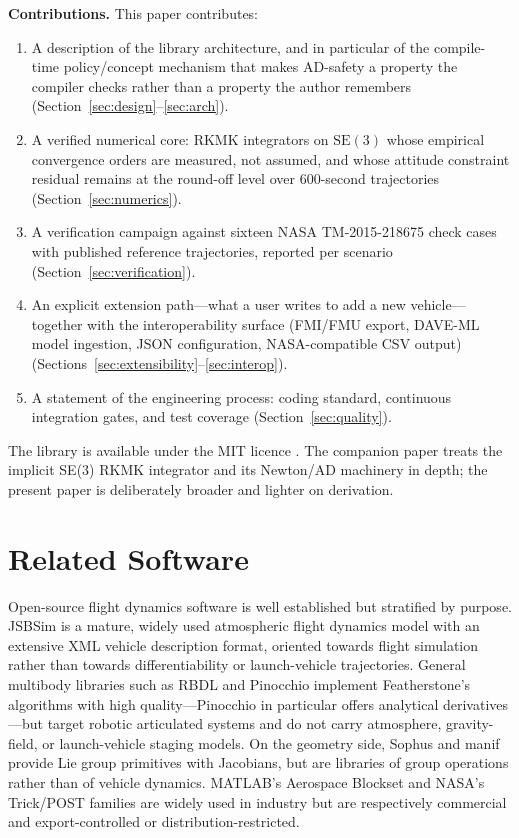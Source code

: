 \documentclass[a4paper,10pt]{article}
\newcommand{\SE}{\mathrm{SE}(3)}
\theoremstyle{definition}
\begin{document}
\textbf{Contributions.}  This paper contributes:

\begin{enumerate}[leftmargin=*, label=(\arabic*)]
  \item A description of the library architecture, and in particular of the
    compile-time policy/concept mechanism that makes AD-safety a property the
    compiler checks rather than a property the author remembers
    (Section~\ref{sec:design}--\ref{sec:arch}).
  \item A verified numerical core: RKMK integrators on $\SE$ whose empirical
    convergence orders are measured, not assumed, and whose attitude constraint
    residual remains at the round-off level over 600-second trajectories
    (Section~\ref{sec:numerics}).
  \item A verification campaign against sixteen NASA TM-2015-218675 check
    cases with published reference trajectories, reported per scenario
    (Section~\ref{sec:verification}).
  \item An explicit extension path---what a user writes to add a new
    vehicle---together with the interoperability surface (FMI/FMU export,
    DAVE-ML model ingestion, JSON configuration, NASA-compatible CSV output)
    (Sections~\ref{sec:extensibility}--\ref{sec:interop}).
  \item A statement of the engineering process: coding standard, continuous
    integration gates, and test coverage (Section~\ref{sec:quality}).
\end{enumerate}

The library is available under the MIT licence \citep{aetherion_2025}.  The
companion paper \citep{tuncer2027rkmk} treats the implicit SE(3) RKMK
integrator and its Newton/AD machinery in depth; the present paper is
deliberately broader and lighter on derivation.

\section{Related Software}
\label{sec:related}

Open-source flight dynamics software is well established but stratified by
purpose.  JSBSim \citep{berndt2004jsbsim} is a mature, widely used
atmospheric flight dynamics model with an extensive XML vehicle description
format, oriented towards flight simulation rather than towards
differentiability or launch-vehicle trajectories.  General multibody
libraries such as RBDL \citep{felis2017rbdl} and Pinocchio
\citep{carpentier2019pinocchio} implement Featherstone's algorithms with high
quality---Pinocchio in particular offers analytical derivatives---but target
robotic articulated systems and do not carry atmosphere, gravity-field, or
launch-vehicle staging models.  On the geometry side, Sophus and manif
\citep{deray2020manif} provide Lie group primitives with Jacobians, but are
libraries of group operations rather than of vehicle dynamics.  MATLAB's
Aerospace Blockset and NASA's Trick/POST families are widely used in
industry but are respectively commercial and export-controlled or
distribution-restricted.
\end{document}
